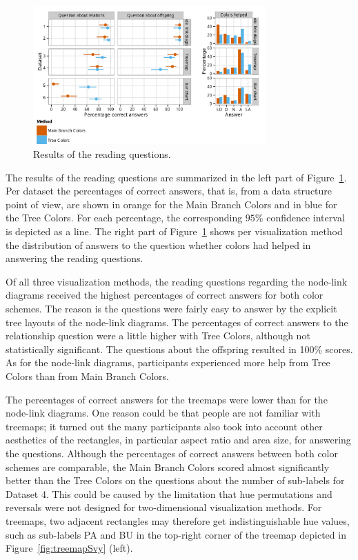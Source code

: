 \documentclass[journal]{vgtc}                %
\begin{document}
\begin{figure}[!b]
  \centering
  \vspace{-1ex}
	\includegraphics[width=3.5in]{user_study_results_mod2.pdf}
  \caption{Results of the reading questions.}\label{fig:user1}
\end{figure}


The results of the reading questions are summarized in the left part of Figure~\ref{fig:user1}. Per dataset the percentages of correct answers, that is, from a data structure point of view, are shown in orange for the Main Branch Colors and in blue for the Tree Colors. For each percentage, the corresponding $95\%$ confidence interval is depicted as a line. The right part of Figure~\ref{fig:user1} shows per visualization method the distribution of answers to the question whether colors had helped in answering the reading questions.

Of all three visualization methods, the reading questions regarding the node-link diagrams received the highest percentages of correct answers for both color schemes. The reason is the questions were fairly easy to answer by the explicit tree layouts of the node-link diagrams. 
The percentages of correct answers to the relationship question were a little higher with Tree Colors, although not statistically significant. The questions about the offspring resulted in 100\% scores. As for the node-link diagrams, participants experienced more help from Tree Colors than from Main Branch Colors.

The percentages of correct answers for the treemaps were lower than for the node-link diagrams. One reason could be that people are not familiar with treemaps; it turned out the many participants also took into account other aesthetics of the rectangles, in particular aspect ratio and area size, for answering the questions. Although the percentages of correct answers between both color schemes are comparable, the Main Branch Colors scored almost significantly better than the Tree Colors on the questions about the number of sub-labels for Dataset 4. This could be caused by the limitation that hue permutations and reversals were not designed for two-dimensional visualization methods. For treemaps, two adjacent rectangles may therefore get indistinguishable hue values, such as sub-labels PA and BU in the top-right corner of the treemap depicted in Figure~\ref{fig:treemapSvy} (left).
\end{document}
